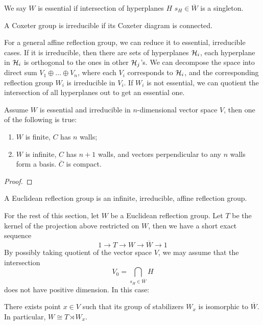 \documentclass[../main.tex]{subfiles}
\begin{document}
\begin{definition}
    We say $W$ is essential if intersection of hyperplanes $H$ $s_H \in \overline W$ is a singleton.
\end{definition}

\begin{definition}
    A Coxeter group is irreducible if its Coxeter diagram is connected.
\end{definition}

For a general affine reflection group, we can reduce it to essential, irreducible cases. If it is irreducible, then there are sets of hyperplanes $\mathcal{H}_i$, each hyperplane in $\mathcal{H}_i$ is orthogonal to the ones in other $\mathcal{H}_j$'s. We can decompose the space into direct sum $V_1 \oplus \dots \oplus V_n$, where each $V_i$ corresponds to $\mathcal{H}_i$, and the corresponding reflection group $W_i$ is irreducible in $V_i$. If $W_i$ is not essential, we can quotient the intersection of all hyperplanes out to get an essential one.

\begin{theorem}
    Assume $W$ is essential and irreducible in $n$-dimensional vector space $V$, then one of the following is true:\begin{enumerate}
        \item $W$ is finite, $C$ has $n$ walls;
        \item $W$ is infinite, $C$ has $n+1$ walls, and vectors perpendicular to any $n$ walls form a basis. $\overline C$ is compact.
    \end{enumerate}
\end{theorem}

\begin{proof}
    
\end{proof}

\begin{definition}
    A Euclidean reflection group is an infinite, irreducible, affine reflection group.
\end{definition}

For the rest of this section, let $W$ be a Euclidean reflection group. Let $T$ be the kernel of the projection above restricted on $W$, then we have a short exact sequence \[
1\rightarrow T\rightarrow W \rightarrow\overline W \rightarrow 1
\]
By possibly taking quotient of the vector space $V$, we may assume that the intersection \[V_0=\bigcap_{s_H\in\overline W}H\] does not have positive dimension. In this case:

\begin{proposition}\label{prop:special}
    There exists point $x\in V$ such that its group of stabilizers $W_x$ is isomorphic to $\overline W$. In particular, $W\cong T\rtimes W_x$.
\end{proposition}
\end{document}
